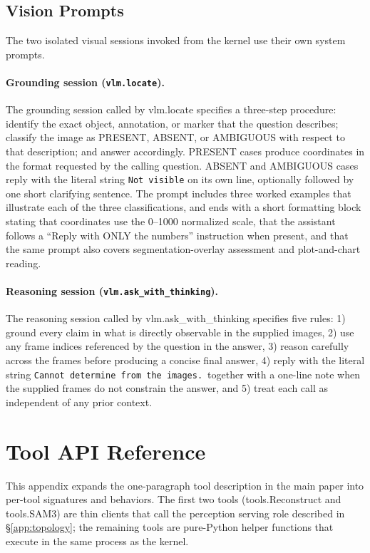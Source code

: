 \documentclass{llmxive}
\providecommand{\apicode}[1]{#1}
\begin{document}
\subsection{Vision Prompts}
\label{app:prompt_vision}
The two isolated visual sessions invoked from the kernel use their own system prompts.

\paragraph{Grounding session (\texttt{vlm.locate}).}
The grounding session called by \apicode{vlm.locate} specifies a three-step procedure: identify the exact object, annotation, or marker that the question describes; classify the image as PRESENT, ABSENT, or AMBIGUOUS with respect to that description; and answer accordingly. PRESENT cases produce coordinates in the format requested by the calling question. ABSENT and AMBIGUOUS cases reply with the literal string \texttt{Not visible} on its own line, optionally followed by one short clarifying sentence. The prompt includes three worked examples that illustrate each of the three classifications, and ends with a short formatting block stating that coordinates use the 0--1000 normalized scale, that the assistant follows a ``Reply with ONLY the numbers'' instruction when present, and that the same prompt also covers segmentation-overlay assessment and plot-and-chart reading.

\paragraph{Reasoning session (\texttt{vlm.ask\_with\_thinking}).}
The reasoning session called by \apicode{vlm.ask_with_thinking} specifies five rules: 1) ground every claim in what is directly observable in the supplied images, 2) use any frame indices referenced by the question in the answer, 3) reason carefully across the frames before producing a concise final answer, 4) reply with the literal string \texttt{Cannot determine from the images.}\ together with a one-line note when the supplied frames do not constrain the answer, and 5) treat each call as independent of any prior context.

\section{Tool API Reference}
\label{app:tools}

This appendix expands the one-paragraph tool description in the main paper into per-tool signatures and behaviors. The first two tools (\apicode{tools.Reconstruct} and \apicode{tools.SAM3}) are thin clients that call the perception serving role described in \S\ref{app:topology}; the remaining tools are pure-Python helper functions that execute in the same process as the kernel.
\end{document}
